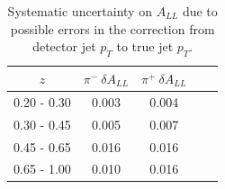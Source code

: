 \begin{table}
  \centering
  \begin{tabular}{|c||c|c||c|c|}
    \hline
    $z$ & $\pi^-~\delta A_{LL}$ & $\pi^+~\delta A_{LL}$ \\
    \hline
    0.20 - 0.30 & 0.003 &  0.004 \\
    0.30 - 0.45 & 0.005 &  0.007 \\
    0.45 - 0.65 & 0.016 &  0.016 \\
    0.65 - 1.00 & 0.010 &  0.016 \\
    \hline
  \end{tabular}
  \caption{Systematic uncertainty on $A_{LL}$ due to possible errors in the correction from detector jet $p_T$ to true jet $p_T$.}
  \label{tab:syst-pt-shift}
\end{table}
